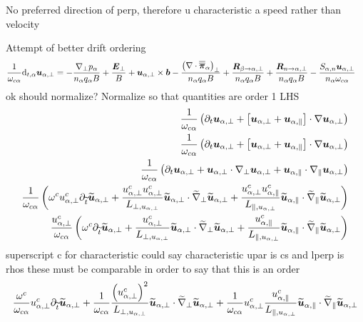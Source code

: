 No preferred direction of perp, therefore u characteristic a speed rather than velocity

Attempt of better drift ordering
%
\begin{align*}
 \frac{1}{\omega_{c\alpha}}\text{d}_{t,\alpha} \boldsymbol{u}_{\alpha,\perp}
 &=
 -
 \frac{
   \nabla_\perp p_\alpha
 }{n_\alpha  q_\alpha B}
 +
 \frac{\boldsymbol{E}_\perp}{B}
 +
 \boldsymbol{u}_{\alpha,\perp}\times\boldsymbol{b}
 -
  \frac{
   \left(\nabla\cdot\boldsymbol{\overline{\overline{\pi}}}_\alpha\right)_\perp
 }{n_\alpha  q_\alpha B}
 +
 \frac{
   \boldsymbol{R}_{\beta \to \alpha,\perp}
 }{n_\alpha q_\alpha B}
 +
 \frac{
   \boldsymbol{R}_{n \to \alpha,\perp}
 }{n_\alpha q_\alpha B}
 -
 \frac{
     S_{\alpha,n}\boldsymbol{u}_{\alpha,\perp}
 }{n_\alpha \omega_{c\alpha}}
\end{align*}
%
ok
should normalize?
Normalize so that quantities are order 1
LHS
%
\begin{align*}
 \frac{1}{\omega_{c\alpha}}
 \left(
 \partial_t \boldsymbol{u}_{\alpha,\perp}
 + \left[\boldsymbol{u}_{\alpha,\perp}
 + \boldsymbol{u}_{\alpha,\|}\right]\cdot\nabla\boldsymbol{u}_{\alpha,\perp}
 \right)
 \\
 \frac{1}{\omega_{c\alpha}}
 \left(
 \partial_t \boldsymbol{u}_{\alpha,\perp}
 + \left[\boldsymbol{u}_{\alpha,\perp}
 + \boldsymbol{u}_{\alpha,\|}\right]\cdot\nabla\boldsymbol{u}_{\alpha,\perp}
 \right)
 \\
 \frac{1}{\omega_{c\alpha}}
 \left(
 \partial_t \boldsymbol{u}_{\alpha,\perp}
 + \boldsymbol{u}_{\alpha,\perp}\cdot\nabla_\perp\boldsymbol{u}_{\alpha,\perp}
 + \boldsymbol{u}_{\alpha,\|}\cdot\nabla_\|\boldsymbol{u}_{\alpha,\perp}
 \right)
 \\
 \frac{1}{\omega_{c\alpha}}
 \left(
 \omega^cu^c_{\alpha,\perp}
 \partial_{\widetilde{ t}} \widetilde{ \boldsymbol{u}}_{\alpha,\perp}
 + \frac{u_{\alpha,\perp}^{c}u_{\alpha,\perp}^{c}}{L_{\perp, u_{\alpha,\perp}}}
 \widetilde{ \boldsymbol{u}}_{\alpha,\perp}\cdot\widetilde{ \nabla}_\perp\widetilde{ \boldsymbol{u}}_{\alpha,\perp}
 + \frac{u^c_{\alpha,\perp}u^c_{\alpha,\|}}{L_{\|, u_{\alpha,\perp}}}
 \widetilde{ \boldsymbol{u}}_{\alpha,\|}\cdot\widetilde{ \nabla}_\|\widetilde{ \boldsymbol{u}}_{\alpha,\perp}
 \right)
 \\
 \frac{u^c_{\alpha,\perp}}{\omega_{c\alpha}}
 \left(
 \omega^c
 \partial_{\widetilde{ t}} \widetilde{ \boldsymbol{u}}_{\alpha,\perp}
 + \frac{u^c_{\alpha,\perp}}{L_{\perp, u_{\alpha,\perp}}}
 \widetilde{ \boldsymbol{u}}_{\alpha,\perp}\cdot\widetilde{ \nabla}_\perp\widetilde{ \boldsymbol{u}}_{\alpha,\perp}
 + \frac{u^c_{\alpha,\|}}{L_{\|, u_{\alpha,\perp}}}
 \widetilde{ \boldsymbol{u}}_{\alpha,\|}\cdot\widetilde{ \nabla}_\|\widetilde{ \boldsymbol{u}}_{\alpha,\perp}
 \right)
\end{align*}
%
superscript c for characteristic
could say characteristic upar is cs and lperp is rhos
these must be comparable in order to say that this is an order
%
\begin{align*}
 \frac{\omega^c}{\omega_{c\alpha}}
 u^c_{\alpha,\perp}
 \partial_{\widetilde{ t}} \widetilde{ \boldsymbol{u}}_{\alpha,\perp}
 +
 \frac{1}{\omega_{c\alpha}}
 \frac{\left(u^c_{\alpha,\perp}\right)^2}{L_{\perp, u_{\alpha,\perp}}}
 \widetilde{ \boldsymbol{u}}_{\alpha,\perp}\cdot\widetilde{ \nabla}_\perp\widetilde{ \boldsymbol{u}}_{\alpha,\perp}
 +
 \frac{1}{\omega_{c\alpha}}
 u^c_{\alpha,\perp}
 \frac{u^c_{\alpha,\|}}{L_{\|, u_{\alpha,\perp}}}
 \widetilde{ \boldsymbol{u}}_{\alpha,\|}\cdot\widetilde{ \nabla}_\|\widetilde{ \boldsymbol{u}}_{\alpha,\perp}
\end{align*}
